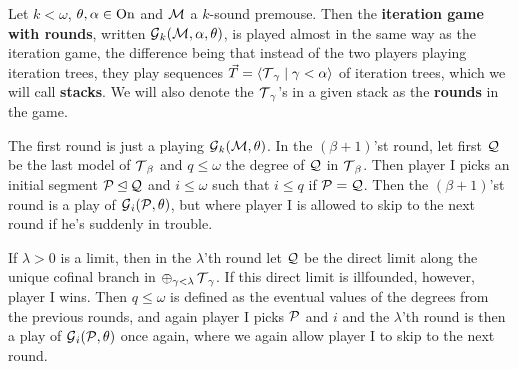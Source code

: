 \qquad Let $k<\omega$, $\theta,\alpha\in\on$ and $\M$ a $k$-sound premouse. Then the \textbf{iteration game with rounds}, written $\G_k(\M,\alpha,\theta)$, is played almost in the same way as the iteration game, the difference being that instead of the two players playing iteration trees, they play sequences $\vec T=\bra{\T_\gamma\mid\gamma<\alpha}$ of iteration trees, which we will call \textbf{stacks}. We will also denote the $\T_\gamma$'s in a given stack as the \textbf{rounds} in the game.

\qquad The first round is just a playing $\G_k(\M,\theta)$. In the $(\beta+1)$'st round, let first $\Q$ be the last model of $\T_\beta$ and $q\leq\omega$ the degree of $\Q$ in $\T_\beta$. Then player I picks an initial segment $\P\init\Q$ and $i\leq\omega$ such that $i\leq q$ if $\P=\Q$. Then the $(\beta+1)$'st round is a play of $\G_i(\P,\theta)$, but where player I is allowed to skip to the next round if he's suddenly in trouble.

\qquad If $\lambda>0$ is a limit, then in the $\lambda$'th round let $\Q$ be the direct limit along the unique cofinal branch in $\oplus_{\gamma<\lambda}\T_\gamma$. If this direct limit is illfounded, however, player I wins. Then $q\leq\omega$ is defined as the eventual values of the degrees from the previous rounds, and again player I picks $\P$ and $i$ and the $\lambda$'th round is then a play of $\G_i(\P,\theta)$ once again, where we again allow player I to skip to the next round.





